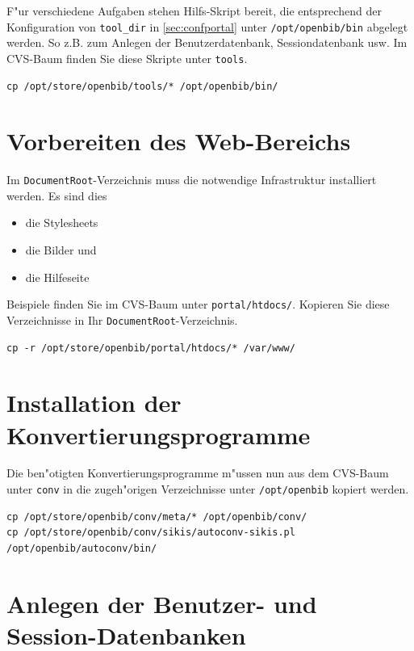 \documentclass[11pt, twoside, a4paper, BCOR8mm, DIV12, bibtotoc,idxtotoc]{scrbook}
\begin{document}
F"ur verschiedene Aufgaben stehen Hilfs-Skript bereit, die
entsprechend der Konfiguration von \texttt{tool\_dir} in
\ref{sec:confportal} unter \texttt{/opt/openbib/bin} abgelegt werden.
So z.B. zum Anlegen der Benutzerdatenbank, Sessiondatenbank usw. Im
CVS-Baum finden Sie diese Skripte unter \texttt{tools}.

\begin{verbatim}
cp /opt/store/openbib/tools/* /opt/openbib/bin/
\end{verbatim}

\section{Vorbereiten des Web-Bereichs}

Im \texttt{DocumentRoot}-Verzeichnis muss die notwendige Infrastruktur
installiert werden. Es sind dies

\begin{itemize}
\item die Stylesheets
\item die Bilder und
\item die Hilfeseite
\end{itemize}

Beispiele finden Sie im CVS-Baum unter
\texttt{portal/htdocs/}. Kopieren Sie diese Verzeichnisse in Ihr
\texttt{DocumentRoot}-Verzeichnis.

\begin{verbatim}
cp -r /opt/store/openbib/portal/htdocs/* /var/www/
\end{verbatim}


\section{Installation der Konvertierungsprogramme}

Die ben"otigten Konvertierungsprogramme m"ussen nun aus dem CVS-Baum
unter \texttt{conv} in die zugeh"origen Verzeichnisse unter
\texttt{/opt/openbib} kopiert werden.

\begin{verbatim}
cp /opt/store/openbib/conv/meta/* /opt/openbib/conv/
cp /opt/store/openbib/conv/sikis/autoconv-sikis.pl /opt/openbib/autoconv/bin/
\end{verbatim}

\section{Anlegen der Benutzer- und Session-Datenbanken}
\end{document}
